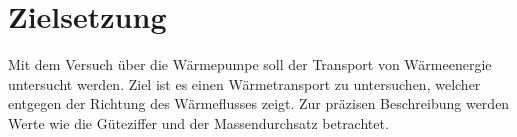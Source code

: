 \section{Zielsetzung}
\label{sec:ziels}
Mit dem Versuch über die Wärmepumpe soll der Transport von Wärmeenergie untersucht werden. Ziel ist es einen
Wärmetransport zu untersuchen, welcher entgegen der Richtung des Wärmeflusses zeigt. Zur präzisen Beschreibung
werden Werte wie die Güteziffer und der Massendurchsatz betrachtet.
